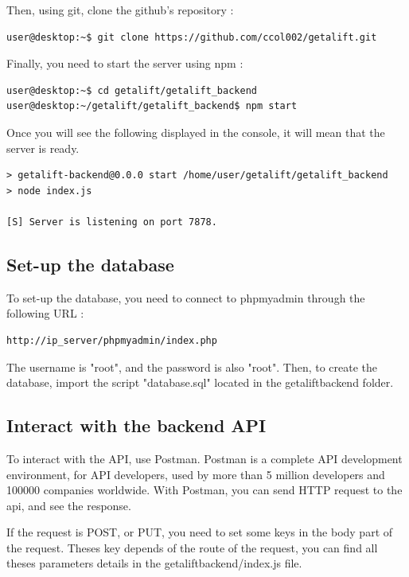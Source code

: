 Then, using git, clone the github's repository :
\begin{lstlisting}[style=DOS]
user@desktop:~$ git clone https://github.com/ccol002/getalift.git
\end{lstlisting}

Finally, you need to start the server using npm :
\begin{lstlisting}[style=DOS]
user@desktop:~$ cd getalift/getalift_backend
user@desktop:~/getalift/getalift_backend$ npm start
\end{lstlisting}

Once you will see the following displayed in the console, it will mean that the server is ready.

\begin{lstlisting}[style=DOS]
> getalift-backend@0.0.0 start /home/user/getalift/getalift_backend
> node index.js

[S] Server is listening on port 7878.
\end{lstlisting}

\subsection{Set-up the database}
To set-up the database, you need to connect to phpmyadmin through the following URL :

\begin{lstlisting}[style=DOS]
http://ip_server/phpmyadmin/index.php
\end{lstlisting}

The username is "root", and the password is also "root". Then, to create the database, import the script "database.sql" located in the getalift\textunderscore backend folder.

\subsection{Interact with the backend API}

To interact with the API, use Postman. Postman is a complete API development environment, for API developers, used by more than 5 million developers and 100000 companies worldwide. With Postman, you can send HTTP request to the api, and see the response.

If the request is POST, or PUT, you need to set some keys in the body part of the request. Theses key depends of the route of the request, you can find all theses parameters details in the getalift\textunderscore backend/index.js file.

